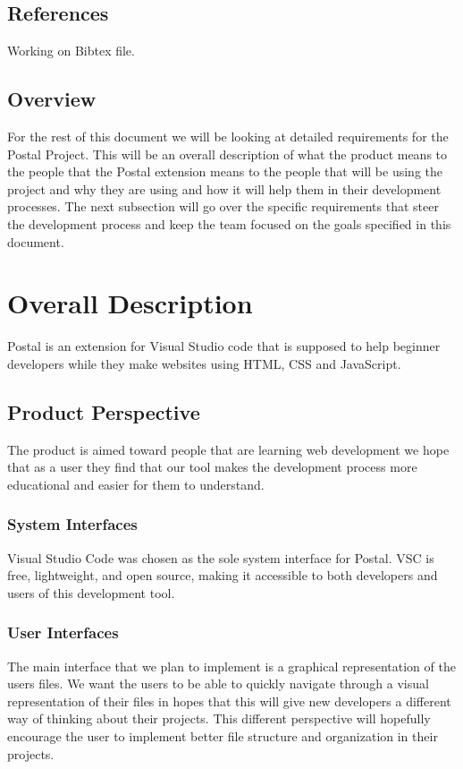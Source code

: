 \documentclass[letterpaper,10pt,titlepage,draftclsnofoot,onecolumn,onesided] {IEEEtran}
\begin{document}
\subsection{References}
Working on Bibtex file.

\subsection{Overview}
For the rest of this document we will be looking at detailed requirements for the Postal Project. 
This will be an overall description of what the product means to the people that the Postal extension means to the people that will be using the project and why they are using and how it will help them in their development processes. The next subsection will go over the specific requirements that steer the development process and keep the team focused on the goals specified in this document.   

\section{Overall Description}
Postal is an extension for Visual Studio code  that is supposed to help beginner developers while they make websites using HTML, CSS and JavaScript.

\subsection{Product Perspective}
The product is aimed toward people that are learning web development we hope that as a user they find that our tool makes the development process more educational and easier for them to understand.

\subsubsection{System Interfaces}
Visual Studio Code was chosen as the sole system interface for Postal. VSC is free, lightweight, and open source, making it accessible to both developers and users of this development tool.

\subsubsection{User Interfaces}
The main interface that we plan to implement is a graphical representation of the users files. 
We want the users to be able to quickly navigate through a visual representation of their files in hopes that this will give new developers a different way of thinking about their projects.
This different perspective will hopefully encourage the user to implement better file structure and organization in their projects.
\end{document}
